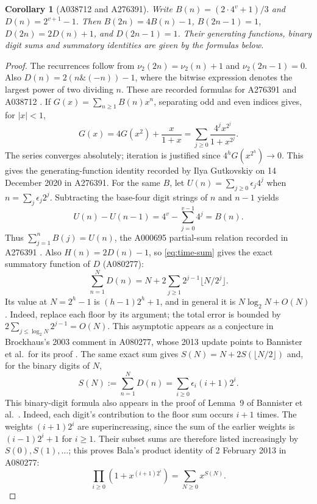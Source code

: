 \documentclass[11pt]{article}
\newtheorem{corollary}{Corollary}
\newcommand{\val}{\nu_2}
\begin{document}
\begin{corollary}[A038712 and A276391]\label{cor:companions}
Write $B(n)=(2\cdot4^v+1)/3$ and $D(n)=2^{v+1}-1$.
Then $B(2n)=4B(n)-1$,
$B(2n-1)=1$, $D(2n)=2D(n)+1$, and $D(2n-1)=1$.
Their generating functions, binary digit sums and summatory identities
are given by the formulas below.
\end{corollary}
\begin{proof}
The recurrences follow from $\val(2n)=\val(n)+1$ and
$\val(2n-1)=0$. Also $D(n)=2(n\mathbin{\&}(-n))-1$, where the bitwise
expression denotes the largest power of two dividing $n$.
These are recorded formulas for A276391 and A038712
\cite{companions}. If $G(x)=\sum_{n\geq1}B(n)x^n$, separating odd
and even indices gives, for $|x|<1$,
\[
 G(x)=4G(x^2)+\frac{x}{1+x}
 =\sum_{j\geq0}\frac{4^j x^{2^j}}{1+x^{2^j}}.
\]
The series converges absolutely; iteration is justified since
$4^hG(x^{2^h})\to0$. This gives the generating-function identity
recorded by Ilya Gutkovskiy on 14 December 2020 in A276391. For the same $B$, let
$U(n)=\sum_{j\geq0}\epsilon_j4^j$ when $n=\sum_j\epsilon_j2^j$.
Subtracting the base-four digit strings of $n$ and $n-1$ yields
\[
 U(n)-U(n-1)=4^v-\sum_{j=0}^{v-1}4^j=B(n).
\]
Thus $\sum_{j=1}^n B(j)=U(n)$, the A000695 partial-sum relation
recorded in A276391 \cite{companions,moser}.
Also $H(n)=2D(n)-1$, so \eqref{eq:time-sum} gives the exact
summatory function of $D$ (A080277):
\[
 \sum_{n=1}^N D(n)=N+2\sum_{j\geq1}2^{j-1}\lfloor N/2^j\rfloor.
\]
Its value at $N=2^h-1$ is $(h-1)2^h+1$, and in general it is
$N\log_2N+O(N)$. Indeed, replace each floor by its argument; the
total error is bounded by $2\sum_{j\leq\log_2N}2^{j-1}=O(N)$.
This asymptotic appears as a conjecture in Brockhaus's 2003 comment in
A080277, whose 2013 update points to Bannister et al.\ for its proof
\cite{partial-sums}. The same exact sum gives
$S(N)=N+2S(\lfloor N/2\rfloor)$ and, for the binary digits of $N$,
\[
 S(N):=\sum_{n=1}^N D(n)=\sum_{i\geq0}\epsilon_i(i+1)2^i.
\]
This binary-digit formula also appears in the proof of Lemma~9 of
Bannister et al.\ \cite{partial-sums}.
Indeed, each digit's contribution to the floor sum occurs $i+1$ times.
The weights $(i+1)2^i$ are superincreasing, since the sum of the earlier
weights is $(i-1)2^i+1$ for $i\geq1$.
Their subset sums are therefore listed increasingly by $S(0),S(1),\ldots$;
this proves Bala's product identity of 2 February 2013 in A080277:
\[
 \prod_{i\geq0}(1+x^{(i+1)2^i})=\sum_{N\geq0}x^{S(N)}.
\]
\end{proof}
\end{document}
